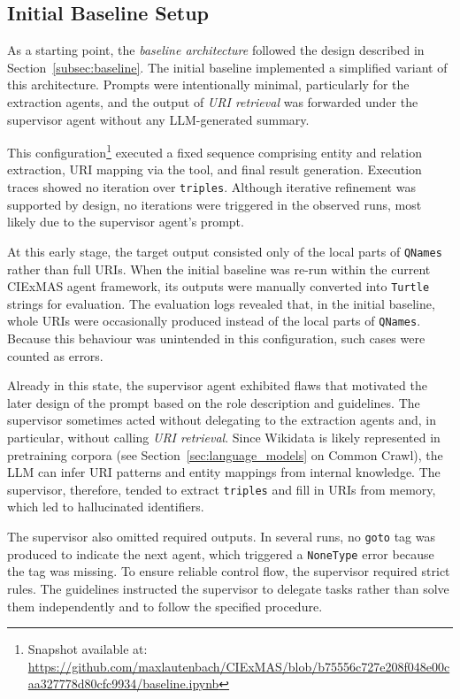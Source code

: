 \documentclass[a4paper,oneside,bibliography=totoc]{scrbook}
\begin{document}
\subsection{Initial Baseline Setup}
\label{subsec:initial_baseline_setup}

As a starting point, the \textit{baseline architecture} followed the design described in Section~\ref{subsec:baseline}. The initial baseline implemented a simplified variant of this architecture. Prompts were intentionally minimal, particularly for the extraction agents, and the output of \textit{\ac{URI} retrieval} was forwarded under the supervisor agent without any \ac{LLM}-generated summary.

This configuration\footnote{Snapshot available at: \url{https://github.com/maxlautenbach/CIExMAS/blob/b75556c727e208f048e00caa327778d80cfc9934/baseline.ipynb}} executed a fixed sequence comprising entity and relation extraction, \ac{URI} mapping via the tool, and final result generation. Execution traces showed no iteration over \texttt{triples}. Although iterative refinement was supported by design, no iterations were triggered in the observed runs, most likely due to the supervisor agent's prompt.

At this early stage, the target output consisted only of the local parts of \texttt{QNames} rather than full \acp{URI}. When the initial baseline was re-run within the current CIExMAS agent framework, its outputs were manually converted into \texttt{Turtle} strings for evaluation. The evaluation logs revealed that, in the initial baseline, whole \acp{URI} were occasionally produced instead of the local parts of \texttt{QNames}. Because this behaviour was unintended in this configuration, such cases were counted as errors.

Already in this state, the supervisor agent exhibited flaws that motivated the later design of the prompt based on the role description and guidelines. The supervisor sometimes acted without delegating to the extraction agents and, in particular, without calling \textit{\ac{URI} retrieval}. Since Wikidata is likely represented in pretraining corpora (see Section~\ref{sec:language_models} on Common Crawl), the \ac{LLM} can infer \ac{URI} patterns and entity mappings from internal knowledge. The supervisor, therefore, tended to extract \texttt{triples} and fill in \acp{URI} from memory, which led to hallucinated identifiers.

The supervisor also omitted required outputs. In several runs, no \texttt{goto} tag was produced to indicate the next agent, which triggered a \texttt{NoneType} error because the tag was missing. To ensure reliable control flow, the supervisor required strict rules. The guidelines instructed the supervisor to delegate tasks rather than solve them independently and to follow the specified procedure.
\end{document}
